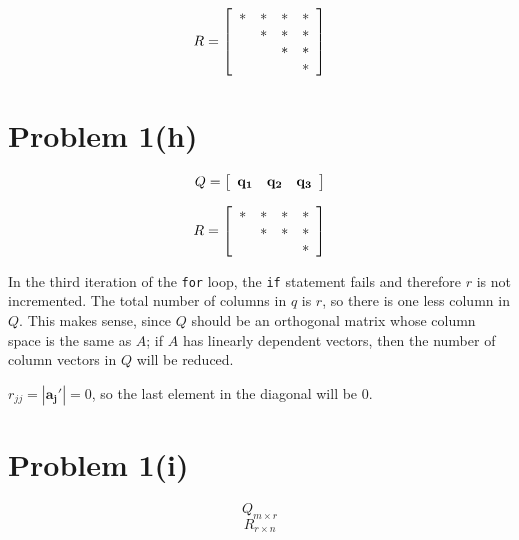\documentclass{article}
\newif\ifstays
\begin{document}
\[
R = \left[\begin{array}{*{4}c}
 \ast & \ast  & \ast & \ast\\
 & \ast & \ast & \ast\\
 &  & \ast &\ast \\
 &  &  & \ast
\end{array}\right]
\]

\ifstays
Here is how you would write the fill pattern for a $4\times 4$ identity matrix:
\[
I = \left[\begin{array}{*{4}c}
 \ast &  &  & \\
 & \ast &  & \\
 &  & \ast & \\
 &  &  & \ast
\end{array}\right]
\]
\fi

\section*{Problem 1(h)}

\[
Q = \left[\begin{array}{*{4}c}
 \mathbf{q_1} & \mathbf{q_2}  & \mathbf{q_3}\\
\end{array}\right]
\]

\[
R = \left[\begin{array}{*{4}c}
 \ast & \ast  & \ast & \ast\\
 & \ast & \ast & \ast\\
 &  &  &\ast  \\
\end{array}\right]
\]

In the third iteration of the \verb#for# loop, the \verb#if# statement fails and therefore $r$ is not incremented. The total number of columns in $q$ is $r$, so there is one less column in $Q$. This makes sense, since $Q$ should be an orthogonal matrix whose column space is the same as $A$; if $A$ has linearly dependent vectors, then the number of column vectors in $Q$ will be reduced.

$r_{jj} = |\mathbf{a_j'}| = 0$, so the last element in the diagonal will be 0.

\section*{Problem 1(i)}

$$Q_{m \times r}$$
$$R_{r \times n}$$
\end{document}
